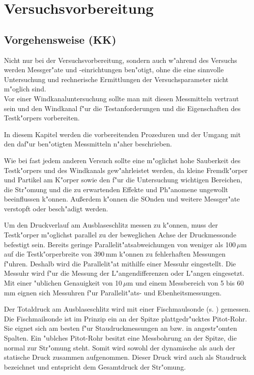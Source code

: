 \section{Versuchsvorbereitung}
\label{sec:Versuchsvorbereitung}
\subsection{Vorgehensweise (KK)}
Nicht nur bei der Versuchsvorbereitung, sondern auch w"ahrend des Versuchs werden Messger"ate und -einrichtungen ben"otigt, ohne die eine sinnvolle Untersuchung und rechnerische Ermittlungen der Versuchsparameter nicht m"oglich sind.\\
Vor einer Windkanaluntersuchung sollte man mit diesen Messmitteln vertraut sein und den Windkanal f"ur die Testanforderungen und die Eigenschaften des Testk"orpers vorbereiten.

In diesem Kapitel werden die vorbereitenden Prozeduren und der Umgang mit den daf"ur ben"otigten Messmitteln n"aher beschrieben.

Wie bei fast jedem anderen Versuch sollte eine m"oglichst hohe Sauberkeit des Testk"orpers und des Windkanals gew"ahrleistet werden, da kleine Fremdk"orper und Partikel am K"orper sowie den f"ur die Untersuchung wichtigen Bereichen, die Str"omung und die zu erwartenden Effekte und Ph"anomene ungewollt beeinflussen k"onnen. Au\ss{}erdem k"onnen die SOnden und weitere Messger"ate verstopft oder besch"adigt werden.

Um den Druckverlauf am Ausblaseschlitz messen zu k"onnen, muss der Testk"orper m"oglichst parallel zu der beweglichen Achse der Druckmessonde befestigt sein. Bereits geringe Parallelit"atsabweichungen von weniger als 100\,$\mu$m auf die Testk"orperbreite von 390\,mm k"onnen zu fehlerhaften Messungen f"uhren. Deshalb wird die Parallelit"at mithilfe einer Messuhr eingestellt. Die Messuhr wird f"ur die Messung der L"angendifferenzen oder L"angen eingesetzt. Mit einer "ublichen Genauigkeit von 10\,$\mu$m und einem Messbereich von 5 bis 60\,mm eignen sich Messuhren f"ur Parallelit"ats- und Ebenheitsmessungen.

Der Totaldruck am Ausblaseschlitz wird mit einer Fischmaulsonde (s. ) gemessen. Die Fischmailsonde ist im Prinzip ein an der Spitze plattgedr"ucktes Pitot-Rohr. Sie eignet sich am besten f"ur Staudruckmessungen an bzw. in angestr"omten Spalten. Ein "ublches Pitot-Rohr besitzt eine Messbohrung an der Spitze, die normal zur Str"omung steht. Somit wird sowohl der dynamische als auch der statische Druck zusammen aufgenommen. Dieser Druck wird auch als Staudruck bezeichnet und entspricht dem Gesamtdruck der Str"omung.

